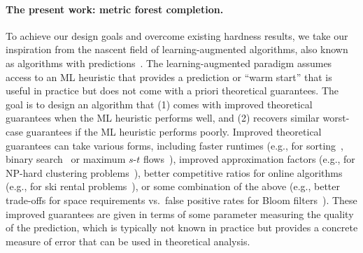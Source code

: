 \paragraph{The present work: metric forest completion.} 
To achieve our design goals and overcome existing hardness results, we take our inspiration from the nascent field of learning-augmented algorithms, also known as algorithms with predictions~\cite{mitzenmacher2022algorithms}. The learning-augmented paradigm assumes access to an ML heuristic that provides a prediction or ``warm start'' that is useful in practice but does not come with a priori theoretical guarantees. The goal is to design an algorithm that (1) comes with improved theoretical guarantees when the ML heuristic performs well, and (2) recovers similar worst-case guarantees if the ML heuristic performs poorly. Improved theoretical guarantees can take various forms, including faster runtimes (e.g., for sorting~\cite{bai2023sorting}, binary search~\cite{lin2022learning} or maximum $s$-$t$ flows~\cite{davies2023predictive}), improved approximation factors (e.g., for NP-hard clustering problems~\cite{ergun2022learning,nguyen2023improved}), better competitive ratios for online algorithms (e.g., for ski rental problems~\cite{shin2023improved}), or some combination of the above (e.g., better trade-offs for space requirements vs.\ false positive rates for Bloom filters~\cite{kraska2018case}). These improved guarantees are given in terms of some parameter measuring the quality of the prediction, which is typically not known in practice but provides a concrete measure of error that can be used in theoretical analysis.

